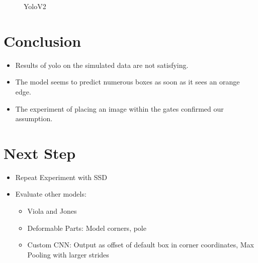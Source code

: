 \documentclass{article}
\begin{document}
\begin{figure}
\begin{minipage}{0.3\textwidth}
	\end{minipage}
	\caption{YoloV2}
	\label{fig:examples_cat}
\end{figure} 
\newpage
\section{Conclusion}

\begin{itemize}
	\item Results of yolo on the simulated data are not satisfying.
	\item The model seems to predict numerous boxes as soon as it sees an orange edge.
	\item The experiment of placing an image within the gates confirmed our assumption.
\end{itemize}

\section{Next Step}
\begin{itemize}
	\item Repeat Experiment with SSD
	\item Evaluate other models:
	\begin{itemize}
		\item Viola and Jones
		\item Deformable Parts: Model corners, pole 
		\item Custom CNN: Output as offset of default box in corner coordinates, Max Pooling with larger strides
	\end{itemize} 
\end{itemize}







\end{document}
